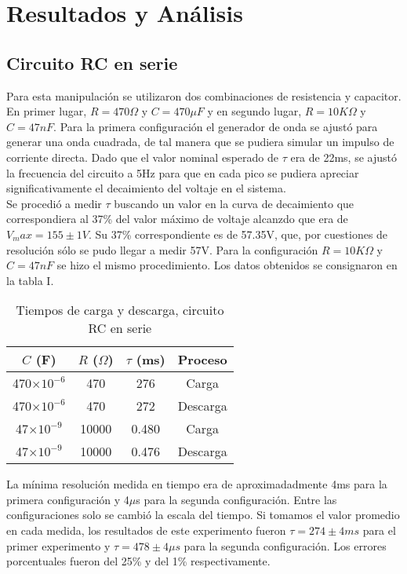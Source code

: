 \documentclass[%
 reprint,
 amsmath,amssymb,
 aps,
]{revtex4-1}
\begin{document}
\section{\label{sec:level1}Resultados y An\'alisis}

\subsection{\label{sec:level2}Circuito RC en serie}
Para esta manipulaci\'on se utilizaron dos combinaciones de resistencia y capacitor. En primer lugar, $R = 470\Omega$ y $C=470\mu F$ y en segundo lugar, $R=10K\Omega$ y $C = 47nF$. Para la primera configuraci\'on el generador de onda se ajust\'o para generar una onda cuadrada, de tal manera que se pudiera simular un impulso de corriente directa. Dado que el valor nominal esperado de $\tau$ era de 22ms, se ajust\'o la frecuencia del circuito a 5Hz para que en cada pico se pudiera apreciar significativamente el decaimiento del voltaje en el sistema.\\

Se procedi\'o a medir $\tau$ buscando un valor en la curva de decaimiento que correspondiera al 37\% del valor m\'aximo de voltaje alcanzdo que era de $V_max=155\pm 1V$. Su 37\% correspondiente es de 57.35V, que, por cuestiones de resoluci\'on s\'olo se pudo llegar a medir 57V. Para la configuración $R=10K\Omega$ y $C = 47nF$ se hizo el mismo procedimiento. Los datos obtenidos se consignaron en la tabla I.\\

\begin{table}[h!]
\centering
\begin{tabular}{|c|c|c|c|}
\hline
$C$ (F) & $R$ ($\Omega$) & $\tau$ (ms) & Proceso\\
\hline
470$\times 10^{-6}$ & 470 & 276 & Carga\\
470$\times 10^{-6}$ & 470 & 272 & Descarga\\
47$\times 10^{-9}$ & 10000 & 0.480 & Carga\\
47$\times 10^{-9}$ & 10000 & 0.476 & Descarga\\
\hline
\end{tabular}
\caption{Tiempos de carga y descarga, circuito RC en serie}
\end{table}

La mínima resolución medida en tiempo era de aproximadadmente 4ms para la primera configuración y 4$\mu$s para la segunda configuración. Entre las configuraciones solo se cambió la escala del tiempo. Si tomamos el valor promedio en cada medida, los resultados de este experimento fueron $\tau = 274 \pm 4ms$ para el primer experimento y $\tau = 478 \pm 4\mu s$ para la  segunda configuración. Los errores porcentuales fueron del  25\% y del 1\% respectivamente. \\
\end{document}
